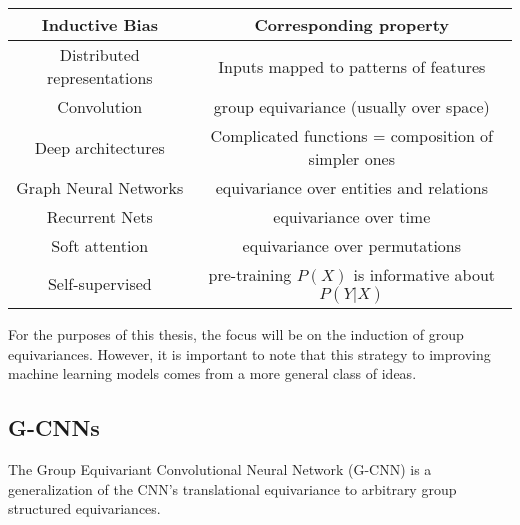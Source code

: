 \begin{table}
	\centering
	\begin{tabular}{|c | c|}
		\hline
		Inductive Bias              & Corresponding property                              \\
		\hline
		\hline
		Distributed representations & Inputs mapped to patterns of features               \\
		\hline
		Convolution                 & group equivariance (usually over space)             \\
		\hline
		Deep architectures          & Complicated functions = composition of simpler ones \\
		\hline
		Graph Neural Networks       & equivariance over entities and relations            \\
		\hline
		Recurrent Nets              & equivariance over time                              \\
		\hline
		Soft attention              & equivariance over permutations                      \\
		\hline
		Self-supervised             & pre-training $P(X)$ is informative about $P(Y |X)$  \\
		\hline
	\end{tabular}
\end{table}

For the purposes of this thesis, the focus will be on the induction of group equivariances. However, it is important to note that this strategy to improving machine learning models comes from a more general class of ideas.


\subsection{G-CNNs}\label{sec:G-CNNs}

The Group Equivariant Convolutional Neural Network (G-CNN) is a generalization of the CNN's translational equivariance to arbitrary group structured equivariances.

